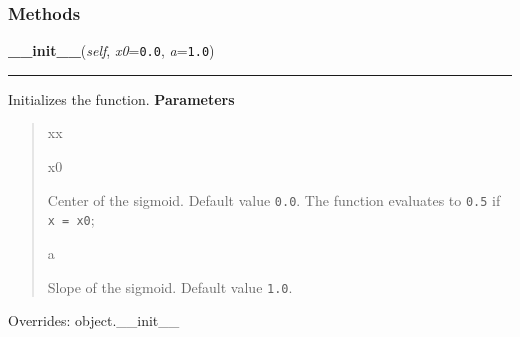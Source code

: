 
  \subsubsection{Methods}

    \vspace{0.5ex}

\hspace{.8\funcindent}\begin{boxedminipage}{\funcwidth}

    \raggedright \textbf{\_\_init\_\_}(\textit{self}, \textit{x0}={\tt 0.0}, \textit{a}={\tt 1.0})

    \vspace{-1.5ex}

    \rule{\textwidth}{0.5\fboxrule}
\setlength{\parskip}{2ex}

Initializes the function.
\setlength{\parskip}{1ex}
      \textbf{Parameters}
      \vspace{-1ex}

      \begin{quote}
        \begin{Ventry}{xx}

          \item[x0]


Center of the sigmoid. Default value \texttt{0.0}. The function evaluates
to \texttt{0.5} if \texttt{x = x0};
          \item[a]


Slope of the sigmoid. Default value \texttt{1.0}.
        \end{Ventry}

      \end{quote}

      Overrides: object.\_\_init\_\_

    \end{boxedminipage}

    \vspace{0.5ex}


